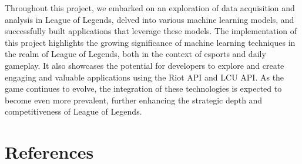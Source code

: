 \documentclass[11pt,a4paper,oneside]{report}
\newcommand{\instructions}[1]{{\color{orange}\itshape #1}}
\renewcommand{\instructions}[1]{}
\begin{document}
Throughout this project, we embarked on an exploration of data acquisition and analysis in League of Legends, delved into various machine learning models, and successfully built applications that leverage these models. The implementation of this project highlights the growing significance of machine learning techniques in the realm of League of Legends, both in the context of esports and daily gameplay. It also showcases the potential for developers to explore and create engaging and valuable applications using the Riot API and LCU API. As the game continues to evolve, the integration of these technologies is expected to become even more prevalent, further enhancing the strategic depth and competitiveness of League of Legends.


\chapter*{References}
\label{references}


\instructions{Many bibliographic styles are acceptable for publications
  in the natural sciences. This template uses a numeric style defined in biblatex
  and that is common in Physics, Mathematics, and Computer Science papers.}

\printbibliography[heading=none]





\end{document}
